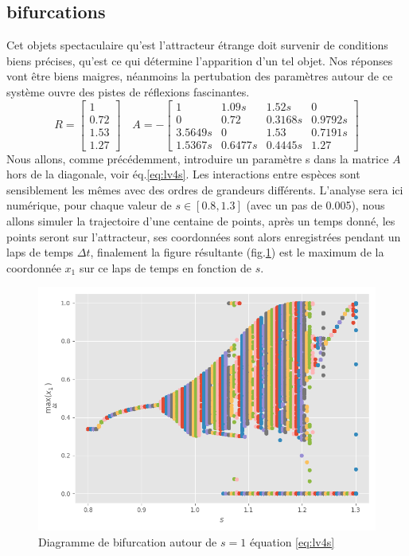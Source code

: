 \documentclass{wsdcr}
\begin{document}
\subsection{bifurcations}
Cet objets spectaculaire qu'est l'attracteur étrange doit survenir de conditions biens précises, qu'est ce qui détermine l'apparition d'un tel objet. Nos réponses vont être biens maigres, néanmoins la pertubation des paramètres autour de ce système ouvre des pistes de réflexions fascinantes.
\begin{equation}
R={\begin{bmatrix}1\\0.72\\1.53\\1.27\end{bmatrix}}\quad A =-{\begin{bmatrix}1&1.09s&1.52s&0\\0&0.72&0.3168s&0.9792s\\3.5649s&0&1.53&0.7191s\\1.5367s&0.6477s&0.4445s&1.27\end{bmatrix}}
\label{eq:lv4s}
\end{equation}
Nous allons, comme précédemment, introduire un paramètre s dans la matrice $A$ hors de la diagonale, voir éq.\ref{eq:lv4s}. Les interactions entre espèces sont sensiblement les mêmes avec des ordres de grandeurs différents. L'analyse sera ici numérique, pour chaque valeur de $s\in [0.8,1.3]$ (avec un pas de 0.005), nous allons simuler la trajectoire d'une centaine de points, après un temps donné, les points seront sur l'attracteur, ses coordonnées sont alors enregistrées pendant un laps de temps $\Delta t$, finalement la figure résultante (fig.\ref{fig:bif4}) est le maximum de la coordonnée $x_1$ sur ce laps de temps en fonction de $s$. 
\begin{figure}
    \centering
    \includegraphics[width=\linewidth]{fig/lv4_bif.png}
    \caption{Diagramme de bifurcation autour de $s=1$ équation \ref{eq:lv4s}}
    \label{fig:bif4}
\end{figure}
\end{document}
